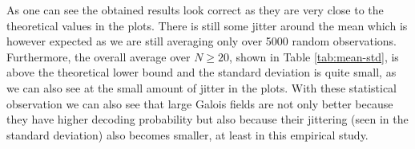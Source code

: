 \documentclass[a4paper,english,10pt]{tumarticle}
\begin{document}
As one can see the obtained results look correct as they are very close to the theoretical values in
the plots. There is still some jitter around the mean which is however expected as we are still
averaging only over 5000 random observations. Furthermore, the overall average over $N\ge20$, shown
in Table \ref{tab:mean-std}, is above the theoretical lower bound and the standard deviation is
quite small, as we can also see at the small amount of jitter in the plots. With these statistical
observation we can also see that large Galois fields are not only better because they have higher
decoding probability but also because their jittering (seen in the standard deviation) also becomes
smaller, at least in this empirical study.








\end{document}
